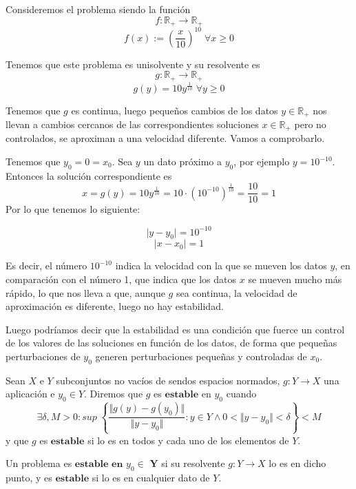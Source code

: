 \begin{ejemplo}
Consideremos el problema siendo la función $$f : \mathbb{R}_+ \rightarrow \mathbb{R}_+$$ $$f(x) := \left( \frac{x}{10} \right) ^{10} \; \forall x \geq 0$$

Tenemos que este problema es unisolvente y su resolvente es $$g : \mathbb{R}_+ \rightarrow \mathbb{R}_+$$ $$g(y) = 10y^{\frac{1}{10}} \; \forall y \geq 0$$

Tenemos que $g$ es continua, luego pequeños cambios de los datos $y \in \mathbb{R}_+$ nos llevan a cambios cercanos de las correspondientes soluciones $x \in \mathbb{R}_+$ pero no controlados, se aproximan a una velocidad diferente. Vamos a comprobarlo.

Tenemos que $y_0 = 0 = x_0$. Sea $y$ un dato próximo a $y_0$, por ejemplo $y = 10^{-10}$. Entonces la solución correspondiente es $$x = g(y) = 10y^{\frac{1}{10}} = 10 \cdot \left( 10^{-10} \right) ^{\frac{1}{10}} = \frac{10}{10} = 1$$ Por lo que tenemos lo siguiente:

$$\vert y - y_0 \vert = 10^{-10}$$ $$\vert x - x_0 \vert = 1$$

Es decir, el número $10^{-10}$ indica la velocidad con la que se mueven los datos $y$, en comparación con el número 1, que indica que los datos $x$ se mueven mucho más rápido, lo que nos lleva a que, aunque $g$ sea continua, la velocidad de aproximación es diferente, luego no hay estabilidad.
\end{ejemplo}

Luego podríamos decir que la estabilidad es una condición que fuerce un control de los valores de las soluciones en función de los datos, de forma que pequeñas perturbaciones de $y_0$ generen perturbaciones pequeñas y controladas de $x_0$.

\begin{ndef}
Sean $X$ e $Y$ subconjuntos no vacíos de sendos espacios normados, $g : Y \rightarrow X$ una aplicación e $y_0 \in Y$. Diremos que $g$ es $\textbf{estable}$ en $y_0$ cuando
 \[ \exists \delta , M > 0 : sup \; \left\lbrace \frac{ \Vert g(y) - g(y_0) \Vert }{ \Vert y - y_0 \Vert } : y \in Y \wedge 0 < \Vert y - y_0 \Vert < \delta \right\rbrace < M \]
y que $g$ es $\textbf{estable}$ si lo es en todos y cada uno de los elementos de $Y$.
\end{ndef}

\begin{ndef}
Un problema es $\textbf{estable en $y_0 \in$ Y}$ si su resolvente $g : Y \rightarrow X$ lo es en dicho punto, y es $\textbf{estable}$ si lo es en cualquier dato de $Y$.
\end{ndef}

